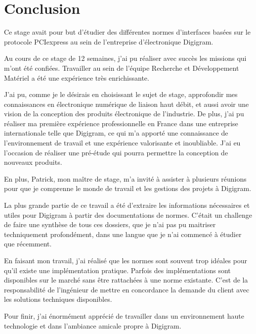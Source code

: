 \chapter{Conclusion}

Ce stage avait pour but d’étudier des différentes normes d’interfaces basées sur 
le protocole PCIexpress au sein de l’entreprise d’électronique Digigram.

Au cours de ce stage de 12 semaines, j’ai pu réaliser avec succès les missions qui m’ont été confiées.
Travailler au sein de l’équipe Recherche et Développement Matériel a été une expérience très enrichissante. 

J’ai pu, comme je le désirais en choisissant le sujet de stage, approfondir mes connaissances 
en électronique numérique de liaison haut débit, et aussi avoir une vision de la conception des produits électronique de l’industrie.
De plus, j’ai pu réaliser ma première expérience professionnelle en France dans une entreprise internationale
telle que Digigram, ce qui m’a apporté une connaissance de l’environnement de travail et une expérience valorisante et inoubliable.
J’ai eu l’occasion de réaliser une pré-étude qui pourra permettre la conception de nouveaux produits. 

En plus, Patrick, mon maître de stage, m’a invité à assister à plusieurs réunions pour que je comprenne 
le monde de travail et les gestions des projets à Digigram.

La plus grande partie de ce travail a été d’extraire les informations nécessaires et utiles pour Digigram 
à partir des documentations de normes. C’était un challenge de faire une synthèse de tous ces dossiers, 
que je n’ai pas pu maitriser techniquement profondément, dans une langue que je n’ai commencé à étudier que récemment.

En faisant mon travail, j’ai réalisé que les normes sont souvent trop idéales pour qu’il existe une implémentation pratique. 
Parfois des implémentations sont disponibles sur le marché sans être rattachées à une norme existante. 
C’est de la responsabilité de l’ingénieur de mettre en concordance la demande du client avec les solutions techniques disponibles.

Pour finir, j’ai énormément apprécié de travailler dans un environnement haute technologie et dans l’ambiance amicale propre à Digigram.